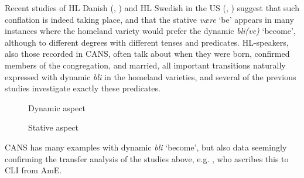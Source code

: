 \documentclass[output=paper]{langscibook}
\begin{document}
Recent studies of HL Danish (\citealt{Kühl2018}, \citealt{KuehlPetersen2017}) and HL Swedish in the US (\citealt{LarssonTingsellAndréasson2015}, \citealt{Hasselmo2005}) suggest that such conflation is indeed taking place, and that the stative \textit{være} ‘be’ appears in many instances where the homeland variety would prefer the dynamic \textit{bli(ve)} ‘become’, although to different degrees with different tenses and predicates. HL-speakers, also those recorded in CANS, often talk about when they were born, confirmed members of the congregation, and married, all important transitions naturally expressed with dynamic \textit{bli} in the homeland varieties, and several of the previous studies investigate exactly these predicates.

\begin{figure}
\caption{Dynamic aspect}
\label{fig:eide:1}
\end{figure}

\begin{figure}
\caption{Stative aspect}
\label{fig:eide:2}
\end{figure}

CANS has many examples with dynamic \textit{bli} ‘become’, but also data seemingly confirming the transfer analysis of the studies above, e.g. \citet{Kühl2018}, who ascribes this to CLI from AmE. 

\ea%
    \label{ex:eide:16}
    \ea  \label{ex:eide:16a}
		  
\end{document}
